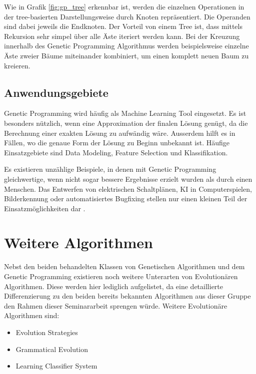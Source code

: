 Wie in Grafik \ref{fig:gp_tree} erkennbar ist, werden die einzelnen Operationen in der tree-basierten
Darstellungsweise durch Knoten repräsentiert. Die Operanden sind dabei jeweils die Endknoten.
Der Vorteil von einem Tree ist, dass mittels Rekursion sehr simpel über alle Äste iteriert werden
kann. Bei der Kreuzung innerhalb des Genetic Programming Algorithmus werden beispielsweise einzelne
Äste zweier Bäume miteinander kombiniert, um einen komplett neuen Baum zu kreieren. \cite{GenTree}

\subsection{Anwendungsgebiete}
Genetic Programming wird häufig als Machine Learning Tool eingesetzt. Es ist besonders nützlich, wenn
eine Approximation der finalen Lösung genügt, da die Berechnung einer exakten Lösung zu aufwändig
wäre. Ausserdem hilft es in Fällen, wo die genaue Form der Lösung zu Beginn unbekannt ist. Häufige
Einsatzgebiete sind Data Modeling, Feature Selection und Klassifikation.

Es existieren unzählige Beispiele, in denen mit Genetic Programming gleichwertige, wenn nicht sogar
bessere Ergebnisse erzielt wurden als durch einen Menschen. Das Entwerfen von elektrischen
Schaltplänen, KI in Computerspielen, Bilderkennung oder automatisiertes Bugfixing stellen nur einen
kleinen Teil der Einsatzmöglichkeiten dar \cite{Koz10}.


\section{Weitere Algorithmen}
Nebst den beiden behandelten Klassen von Genetischen Algorithmen und dem Genetic Programming existieren
noch weitere Unterarten von Evolutionären Algorithmen. Diese werden hier lediglich aufgelistet, da
eine detaillierte Differenzierung zu den beiden bereits bekannten Algorithmen aus dieser Gruppe den Rahmen
dieser Seminararbeit sprengen würde. Weitere Evolutionäre Algorithmen sind:

\begin{itemize}
  \item Evolution Strategies
  \item Grammatical Evolution
  \item Learning Classifier System
\end{itemize}
